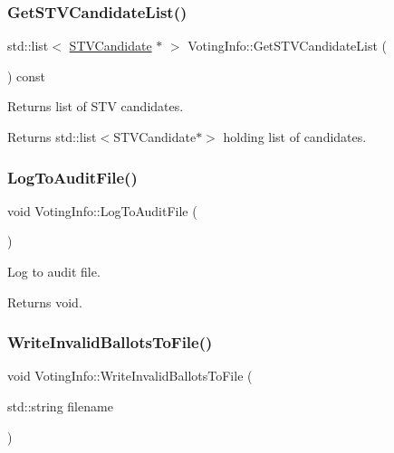 \subsubsection{\texorpdfstring{Get\+S\+T\+V\+Candidate\+List()}{GetSTVCandidateList()}}
{\footnotesize\ttfamily std\+::list$<$ \hyperlink{classSTVCandidate}{S\+T\+V\+Candidate} $\ast$ $>$ Voting\+Info\+::\+Get\+S\+T\+V\+Candidate\+List (\begin{DoxyParamCaption}{ }\end{DoxyParamCaption}) const}



Returns list of S\+TV candidates. 

\begin{DoxyReturn}{Returns}
std\+::list$<$\+S\+T\+V\+Candidate$\ast$$>$ holding list of candidates. 
\end{DoxyReturn}
\mbox{\label{classVotingInfo_a04dd909817f43719f40b3d537b74fe67}} 
\subsubsection{\texorpdfstring{Log\+To\+Audit\+File()}{LogToAuditFile()}}
{\footnotesize\ttfamily void Voting\+Info\+::\+Log\+To\+Audit\+File (\begin{DoxyParamCaption}{ }\end{DoxyParamCaption})}



Log to audit file. 

\begin{DoxyReturn}{Returns}
void. 
\end{DoxyReturn}
\mbox{\label{classVotingInfo_a2b8291b20085e9e4397f3d0dd0cc1a32}} 
\subsubsection{\texorpdfstring{Write\+Invalid\+Ballots\+To\+File()}{WriteInvalidBallotsToFile()}}
{\footnotesize\ttfamily void Voting\+Info\+::\+Write\+Invalid\+Ballots\+To\+File (\begin{DoxyParamCaption}\item[{std\+::string}]{filename }\end{DoxyParamCaption})}



